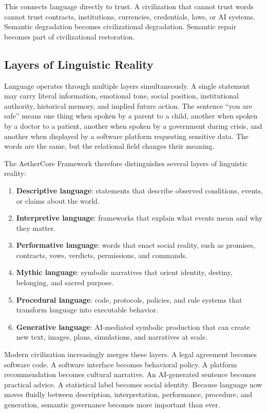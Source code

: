 \documentclass[12pt]{article}
\begin{document}
This connects language directly to trust. A civilization that cannot trust words cannot trust contracts, institutions, currencies, credentials, laws, or AI systems. Semantic degradation becomes civilizational degradation. Semantic repair becomes part of civilizational restoration.

\subsection{Layers of Linguistic Reality}

Language operates through multiple layers simultaneously. A single statement may carry literal information, emotional tone, social position, institutional authority, historical memory, and implied future action. The sentence ``you are safe'' means one thing when spoken by a parent to a child, another when spoken by a doctor to a patient, another when spoken by a government during crisis, and another when displayed by a software platform requesting sensitive data. The words are the same, but the relational field changes their meaning.

The AetherCore Framework therefore distinguishes several layers of linguistic reality:

\begin{enumerate}
  \item \textbf{Descriptive language}: statements that describe observed conditions, events, or claims about the world.
  \item \textbf{Interpretive language}: frameworks that explain what events mean and why they matter.
  \item \textbf{Performative language}: words that enact social reality, such as promises, contracts, vows, verdicts, permissions, and commands.
  \item \textbf{Mythic language}: symbolic narratives that orient identity, destiny, belonging, and sacred purpose.
  \item \textbf{Procedural language}: code, protocols, policies, and rule systems that transform language into executable behavior.
  \item \textbf{Generative language}: AI-mediated symbolic production that can create new text, images, plans, simulations, and narratives at scale.
\end{enumerate}

Modern civilization increasingly merges these layers. A legal agreement becomes software code. A software interface becomes behavioral policy. A platform recommendation becomes cultural narrative. An AI-generated sentence becomes practical advice. A statistical label becomes social identity. Because language now moves fluidly between description, interpretation, performance, procedure, and generation, semantic governance becomes more important than ever.
\end{document}
